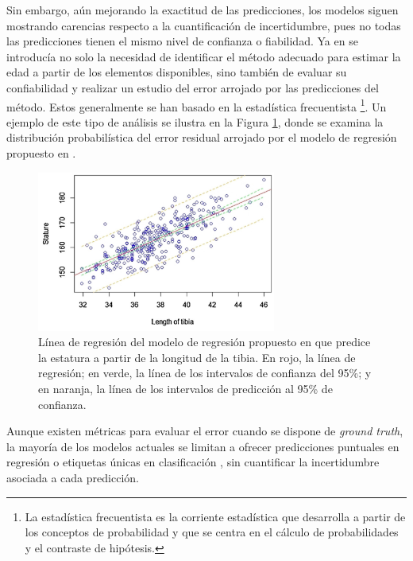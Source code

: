 Sin embargo, aún mejorando la exactitud de las predicciones, los modelos siguen mostrando carencias respecto a 
la cuantificación de incertidumbre, pues no todas las predicciones tienen el mismo nivel de confianza o 
fiabilidad. Ya en \cite{ferrante2009} se introducía no solo la necesidad de identificar el método adecuado 
para estimar la edad a partir de los elementos disponibles, sino también de evaluar su confiabilidad y 
realizar un estudio del error arrojado por las predicciones del método. Estos generalmente se han basado en 
la estadística frecuentista \cite{verma2020, stepanovsky2024, heinrich2024}
\footnote{
    La estadística frecuentista es la corriente estadística que desarrolla a partir de los conceptos de 
    probabilidad y que se centra en el cálculo de probabilidades y el contraste de hipótesis.
}.
Un ejemplo de este tipo de análisis se ilustra en la Figura \ref{fig:regression_lentibia_stature}, donde se 
examina la distribución probabilística del error residual arrojado por el modelo de regresión propuesto en 
\cite{verma2020}.

\begin{figure}[h]
    \centering
    \includegraphics[width=0.7\textwidth]{capitulos/cap_01/imagenes/regression_line_lentibia_stature.png}
    \caption[
        Línea de regresión del modelo de regresión propuesto en \cite{verma2020} que predice la estatura
        a partir de la longitud de la tibia.
    ]{
        Línea de regresión del modelo de regresión propuesto en \cite{verma2020} que predice la estatura 
        a partir de la longitud de la tibia. En rojo, la línea de regresión; en verde, la línea de los 
        intervalos de confianza del 95\%; y en naranja, la línea de los intervalos de predicción al 95\% de 
        confianza.
    } 
    \label{fig:regression_lentibia_stature}
\end{figure}

Aunque existen métricas para evaluar el error cuando se dispone de \textit{ground truth}, la mayoría de los 
modelos actuales se limitan a ofrecer predicciones puntuales en regresión 
\cite{park2024, imaizumi2021, stepanovsky2024} o etiquetas únicas en clasificación 
\cite{venema2022, park2024}, sin cuantificar la incertidumbre asociada a cada predicción.

